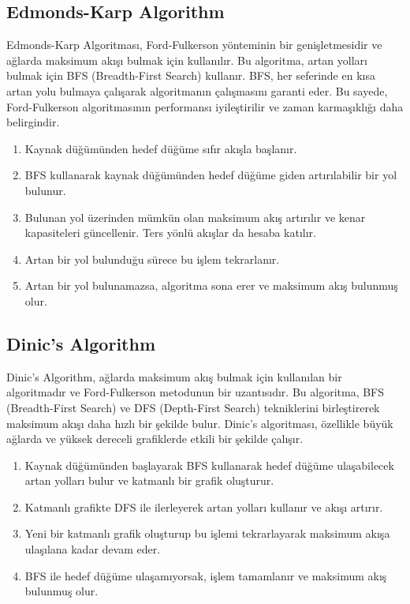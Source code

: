 \newpage

\subsection{Edmonds-Karp Algorithm}

Edmonds-Karp Algoritması, Ford-Fulkerson yönteminin bir genişletmesidir ve ağlarda maksimum akışı bulmak için kullanılır. Bu algoritma, artan yolları bulmak için BFS (Breadth-First Search) kullanır. BFS, her seferinde en kısa artan yolu bulmaya çalışarak algoritmanın çalışmasını garanti eder. Bu sayede, Ford-Fulkerson algoritmasının performansı iyileştirilir ve zaman karmaşıklığı daha belirgindir. 

\begin{enumerate}
    \item Kaynak düğümünden hedef düğüme sıfır akışla başlanır.
    \item BFS kullanarak kaynak düğümünden hedef düğüme giden artırılabilir bir yol bulunur.
    \item Bulunan yol üzerinden mümkün olan maksimum akış artırılır ve kenar kapasiteleri güncellenir. Ters yönlü akışlar da hesaba katılır.
    \item Artan bir yol bulunduğu sürece bu işlem tekrarlanır.
    \item Artan bir yol bulunamazsa, algoritma sona erer ve maksimum akış bulunmuş olur.
\end{enumerate}

\newpage

\subsection{Dinic's Algorithm}

Dinic's Algorithm, ağlarda maksimum akış bulmak için kullanılan bir algoritmadır ve Ford-Fulkerson metodunun bir uzantısıdır. Bu algoritma, BFS (Breadth-First Search) ve DFS (Depth-First Search) tekniklerini birleştirerek maksimum akışı daha hızlı bir şekilde bulur. Dinic’s algoritması, özellikle büyük ağlarda ve yüksek dereceli grafiklerde etkili bir şekilde çalışır. 

\begin{enumerate}
    \item Kaynak düğümünden başlayarak BFS kullanarak hedef düğüme ulaşabilecek artan yolları bulur ve katmanlı bir grafik oluşturur.
    \item Katmanlı grafikte DFS ile ilerleyerek artan yolları kullanır ve akışı artırır.
    \item Yeni bir katmanlı grafik oluşturup bu işlemi tekrarlayarak maksimum akışa ulaşılana kadar devam eder.
    \item BFS ile hedef düğüme ulaşamıyorsak, işlem tamamlanır ve maksimum akış bulunmuş olur.
\end{enumerate}

